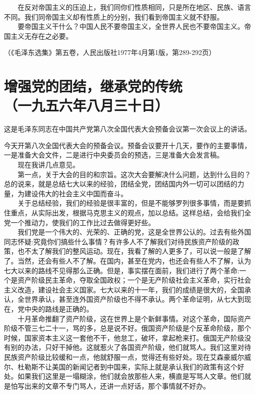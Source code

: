 \documentclass[cn,11pt,chinese]{elegantbook}
\def\myformat#1{\hfil\hfil #1}
\begin{document}
　　在反对帝国主义的压迫上，我们同你们性质相同，只是所在地区、民族、语言不同。我们同帝国主义却有性质上的分别，我们看到帝国主义就不舒服。\\
　　要帝国主义干什么？中国人民不要帝国主义，全世界人民也不要帝国主义。帝国主义无存在之必要。\\
\begin{flushright}（《毛泽东选集》第五卷，人民出版社1977年4月第1版，第289-292页）\end{flushright}
\newpage\section*{\myformat{增强党的团结，继承党的传统}\\\myformat{（一九五六年八月三十日）}}
\begin{introduction}\item  这是毛泽东同志在中国共产党第八次全国代表大会预备会议第一次会议上的讲话。\end{introduction}
今天开第八次全国代表大会的预备会议。预备会议要开十几天，要作的主要事情，一是准备大会文件，二是进行中央委员会的预选，三是准备大会发言稿。\\
　　现在我讲几点意见。\\
　　第一点，关于大会的目的和宗旨。这次大会要解决什么问题，达到什么目的？总的说来，就是总结七大以来的经验，团结全党，团结国内外一切可以团结的力量，为建设伟大的社会主义中国而奋斗。\\
　　关于总结经验，我们的经验是很丰富的，但是不能够罗列很多事情，而是要抓住重点，从实际出发，根据马克思主义的观点，加以总结。这样总结，会给我们全党一个推动力，使我们的工作比过去做得更好些。\\
　　我们党是一个伟大的、光荣的、正确的党，这是全世界公认的。过去有些外国同志怀疑:究竟你们搞些什么事情？有许多人不了解我们对待民族资产阶级的政策，也不太了解我们的整风运动。现在，我看了解的人更多了，可以说一般是了解了。当然，还会有些人不了解。在国内，甚至在党内，也还会有些人不了解，认为七大以来的路线不见得那么正确。但是，事实摆在面前，我们进行了两个革命:一个是资产阶级民主革命，夺取全国政权；一个是无产阶级社会主义革命，实行社会主义改造，建设社会主义国家。七大以来的十一年，我们的成绩是很大的，全国承认，全世界承认，甚至连外国资产阶级也不得不承认。两个革命证明，从七大到现在，党中央的路线是正确的。\\
　　十月革命推翻了资产阶级，这在世界上是个新鲜事情。对这个革命，国际资产阶级不管三七二十一，骂的多，总是说不好。俄国资产阶级是个反革命阶级，那个时候，国家资本主义这一套他不干，他怠工，破坏，拿起枪来打。俄国无产阶级没有别的办法，只好干掉他。这就惹火了各国资产阶级，他们就骂人。我们这里对待民族资产阶级比较缓和一点，他就舒服一点，觉得还有些好处。现在艾森豪威尔威尔、杜勒斯不让美国的新闻记者到中国来，实际上就是承认我们的政策有这个好处。如果我们这里是一塌糊涂，他们就会放那些人来，横直是写骂人文章。他们就是怕写出来的文章不专门骂人，还讲一点好话，那个事情就不好办。\\
\end{document}
